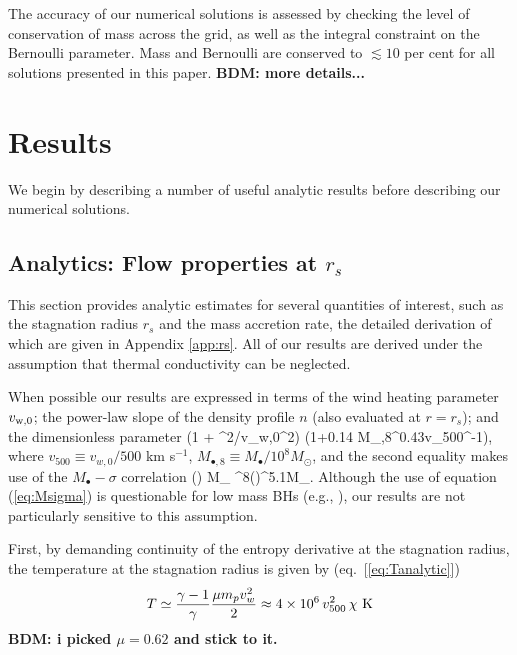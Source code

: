 \documentclass[usenatbib,fleqn]{mn2e}
\newcommand{\rs}{r_s}
\newcommand{\Mbheight}{M_{\bullet,8}}
\begin{document}
The accuracy of our numerical solutions is assessed by checking the level of conservation of mass across the grid, as well as the integral constraint on the Bernoulli parameter.  Mass and Bernoulli are conserved to $\lesssim 10$ per cent for all solutions presented in this paper.  {\bf BDM: more details...}


\section{Results}

We begin by describing a number of useful analytic results before describing our numerical solutions.  

\label{sec:results}
\subsection{Analytics: Flow properties at $\rs$}

This section provides analytic estimates for several quantities of interest, such as the stagnation radius $\rs$ and the mass accretion rate, the detailed derivation of which are given in Appendix \ref{app:rs}.  All of our results are derived under the assumption that thermal conductivity can be neglected.

When possible our results are expressed in terms of the wind heating parameter $v_{\rm w,0}$; the power-law slope of the density profile $n$ (also evaluated at $r = \rs$); and the dimensionless parameter
\be
\chi \equiv \left(1 + \sigma^{2}/v_{\rm w,0}^{2}\right) \approx \left(1+0.14 \Mbheight^{0.43}v_{500}^{-1}\right),
\ee
where $v_{500} \equiv v_{w,0}/500$ km s$^{-1}$, $M_{\bullet,8} \equiv M_{\bullet}/10^{8}M_{\odot}$, and the second equality makes use of the $M_{\bullet}-\sigma$ correlation (\citealt{Gultekin+09})
\be
M_{\bullet} ^{8}\left(\right)^{5.1}M_{\odot}.
\label{eq:Msigma}
\ee
Although the use of equation (\ref{eq:Msigma}) is questionable for low mass BHs (e.g., \citealt{Greene&Ho07}), our results are not particularly sensitive to this assumption.  

First, by demanding continuity of the entropy derivative at the stagnation radius, the temperature at the stagnation radius is given by (eq.~[\ref{eq:Tanalytic}])
\begin{align}
T \simeq \frac{\gamma-1}{\gamma}\frac{\mu m_p v_{w}^{2}}{2} \approx 4 \times 10^6\,v_{500}^2 \, \chi   \,\,{\rm K} 
\end{align}
{\bf BDM: i picked $\mu = 0.62$ and stick to it.}
\end{document}
